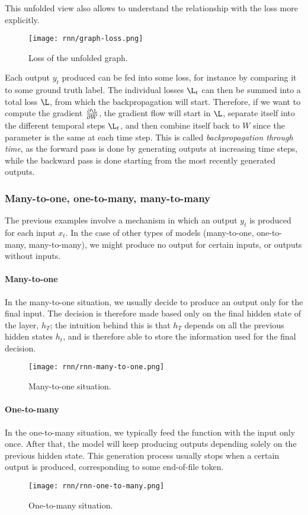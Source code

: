 This unfolded view also allows to understand the relationship with the loss more explicitly.
\begin{figure}[H]
    \centering
    \texttt{[image: rnn/graph-loss.png]}
    \caption{Loss of the unfolded graph.}
\end{figure}
Each output $y_t$ produced can be fed into some loss, for instance by comparing it to some ground truth label. The individual losses $\L_t$ can then be summed into a total loss $\L$, from which the backpropagation will start. Therefore, if we want to compute the gradient $\frac{\partial\L}{\partial W}$, the gradient flow will start in $\L$, separate itself into the different temporal steps $\L_t$, and then combine itself back to $W$ since the parameter is the same at each time step. This is called \emph{backpropagation through time}, as the forward pass is done by generating outputs at increasing time steps, while the backward pass is done starting from the most recently generated outputs.

\subsubsection{Many-to-one, one-to-many, many-to-many}
The previous examples involve a mechanism in which an output $y_t$ is produced for each input $x_t$. In the case of other types of models (many-to-one, one-to-many, many-to-many), we might produce no output for certain inputs, or outputs without inputs.

\paragraph*{Many-to-one}
In the many-to-one situation, we usually decide to produce an output only for the final input. The decision is therefore made based only on the final hidden state of the layer, $h_T$; the intuition behind this is that $h_T$ depends on all the previous hidden states $h_t$, and is therefore able to store the information used for the final decision.
\begin{figure}[H]
    \centering
    \texttt{[image: rnn/rnn-many-to-one.png]}
    \caption{Many-to-one situation.}
\end{figure}

\paragraph*{One-to-many}
In the one-to-many situation, we typically feed the function with the input only once. After that, the model will keep producing outputs depending solely on the previous hidden state. This generation process usually stops when a certain output is produced, corresponding to some end-of-file token.
\begin{figure}[H]
    \centering
    \texttt{[image: rnn/rnn-one-to-many.png]}
    \caption{One-to-many situation.}
\end{figure}

